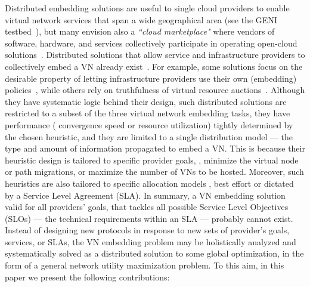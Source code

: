 \documentclass[a4paper, 10pt, conference]{ieeeconf}
\begin{document}
Distributed embedding solutions are useful to single cloud providers to enable virtual network services that span a wide geographical area (see  the GENI testbed~\cite{GENI}), but many envision also a {\it ``cloud marketplace"} where vendors of software, hardware, and services collectively participate in operating open-cloud solutions~\cite{azer-ocx}. 
Distributed solutions that allow service and infrastructure providers to collectively embed a VN already exist~\cite{Houidi-distributedVNM,V-Mart,Polyvine}. For example, some solutions focus on the desirable property of letting infrastructure providers use their own (embedding) policies~\cite{Polyvine}, while others rely on truthfulness of virtual resource auctions~\cite{V-Mart}.  
Although they have systematic logic behind their design, such distributed solutions are restricted to a subset of the three virtual network embedding tasks, they have performance ( convergence speed or resource utilization) tightly determined by the chosen heuristic, and they are limited to a single distribution model --- the type and amount of information propagated to embed a VN. 
This is because their heuristic design is tailored to specific provider goals, , minimize the virtual node or path migrations, or maximize the number of VNs to be hosted. Moreover, such heuristics are also tailored to specific allocation models , best effort or dictated by a Service Level Agreement (SLA). 
In summary, a VN embedding solution valid for all providers' goals, that tackles all possible Service Level Objectives (SLOs) --- the technical requirements within an SLA --- probably cannot exist. 
Instead of designing new protocols in response to new sets of provider's goals, services, or SLAs, the VN embedding problem may be holistically analyzed and systematically solved as a distributed solution to some global optimization, in the form of a general network utility maximization problem.
To this aim, in this paper we present the following contributions:
\end{document}
